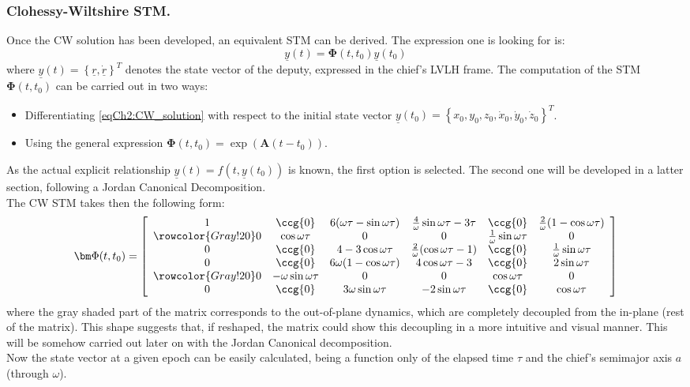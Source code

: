 		\subsubsection{Clohessy-Wiltshire STM.}
		\indent Once the CW solution has been developed, an equivalent STM can be derived. The expression one is looking for is:
		\[
		\underline{y}(t) = \bm \Phi (t, t_0) \underline{y}(t_0)
		\]
		\noindent where $\underline{y}(t) = \left\{ \underline{r}, \underline{\dot{r}}\right\}^T$ denotes the state vector of the deputy, expressed in the chief's LVLH frame. The computation of the STM $\bm \Phi (t, t_0)$ can be carried out in two ways:
		\begin{itemize}
		\item[\GMVred{A.}] Differentiating \eqref{eqCh2:CW_solution} with respect to the initial state vector $\underline{y}(t_0) = \left\{ x_0, y_0, z_0, \dot{x}_0, \dot{y}_0, \dot{z}_0\right\}^T$.
		\item[\GMVred{B.}] Using the general expression $\bm \Phi (t, t_0) = \exp\left( \bm A (t - t_0)\right) $.
		\end{itemize}
		\indent As the actual explicit relationship $\underline{y}(t) = f (t, \underline{y}(t_0))$ is known, the first option is selected. The second one will be developed in a latter section, following a Jordan Canonical Decomposition.\\
		\indent The CW STM takes then the following form:
		\begin{equation}
		\bm \Phi (t, t_0) = \left[
		\begin{array}{cccccc}
		1	& \ccg{0}					& 6(\omega\tau - \sin\omega\tau)	& \frac{4}{\omega} \sin\omega\tau - 3\tau	& \ccg{0}						& \frac{2}{\omega} (1 - \cos\omega\tau) \\
		\rowcolor{Gray!20}
		0	& \cos\omega\tau			& 0									& 0 										&\frac{1}{\omega}\sin\omega\tau & 0 \\
		0	& \ccg{0}					& 4 - 3 \cos\omega\tau				& \frac{2}{\omega} (\cos\omega\tau - 1)		& \ccg{0}						& \frac{1}{\omega} \sin\omega\tau\\
		0	& \ccg{0}					& 6\omega (1 - \cos\omega\tau)		& 4\cos\omega\tau - 3						& \ccg{0}						& 2\sin\omega\tau	\\
		\rowcolor{Gray!20}
		0	& -\omega \sin\omega\tau	& 0									& 0											& \cos\omega\tau				& 0\\
		0	& \ccg{0}					& 3\omega\sin\omega\tau 			& -2 \sin\omega\tau							& \ccg{0}						& \cos\omega\tau
		\end{array}\right]
		\label{eqCh2:CW_STM}
		\end{equation}
		\noindent where the gray shaded part of the matrix corresponds to the out-of-plane dynamics, which are completely decoupled from the in-plane (rest of the matrix). This shape suggests that, if reshaped, the matrix could show this decoupling in a more intuitive and visual manner. This will be somehow carried out later on with the Jordan Canonical decomposition.\\
		\indent Now the state vector at a given epoch can be easily calculated, being a function only of the elapsed time $\tau$ and the chief's semimajor axis $a$ (through $\omega$).
